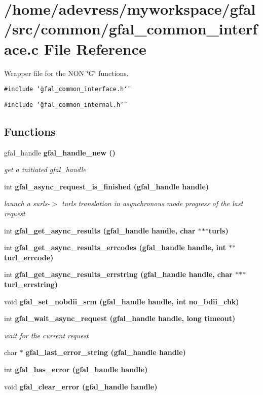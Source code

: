 \section{/home/adevress/myworkspace/gfal/src/common/gfal\_\-common\_\-interface.c File Reference}
\label{gfal__common__interface_8c}
Wrapper file for the NON \char`\"{}G\char`\"{} functions. 

{\tt \#include \char`\"{}gfal\_\-common\_\-interface.h\char`\"{}}\par
{\tt \#include \char`\"{}gfal\_\-common\_\-internal.h\char`\"{}}\par
\subsection*{Functions}
\begin{CompactItemize}
\item 
gfal\_\-handle \bf{gfal\_\-handle\_\-new} ()
\begin{CompactList}\small\item\em get a initiated gfal\_\-handle \item\end{CompactList}\item 
int \bf{gfal\_\-async\_\-request\_\-is\_\-finished} (gfal\_\-handle handle)
\begin{CompactList}\small\item\em launch a surls-$>$ turls translation in asynchronous mode progress of the last request \item\end{CompactList}\item 
int \bf{gfal\_\-get\_\-async\_\-results} (gfal\_\-handle handle, char $\ast$$\ast$$\ast$turls)
\item 
int \bf{gfal\_\-get\_\-async\_\-results\_\-errcodes} (gfal\_\-handle handle, int $\ast$$\ast$turl\_\-errcode)
\item 
int \bf{gfal\_\-get\_\-async\_\-results\_\-errstring} (gfal\_\-handle handle, char $\ast$$\ast$$\ast$turl\_\-errstring)
\item 
void \bf{gfal\_\-set\_\-nobdii\_\-srm} (gfal\_\-handle handle, int no\_\-bdii\_\-chk)
\item 
int \bf{gfal\_\-wait\_\-async\_\-request} (gfal\_\-handle handle, long timeout)
\begin{CompactList}\small\item\em wait for the current request \item\end{CompactList}\item 
char $\ast$ \bf{gfal\_\-last\_\-error\_\-string} (gfal\_\-handle handle)
\item 
int \bf{gfal\_\-has\_\-error} (gfal\_\-handle handle)
\item 
void \bf{gfal\_\-clear\_\-error} (gfal\_\-handle handle)
\end{CompactItemize}


